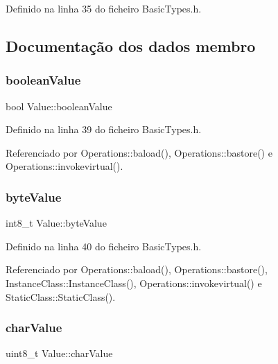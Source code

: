 Definido na linha 35 do ficheiro Basic\+Types.\+h.



\subsection{Documentação dos dados membro}
\mbox{\label{structValue_a30e34bb4435bed7be1c5287e8f4c4838}} 
\subsubsection{\texorpdfstring{boolean\+Value}{booleanValue}}
{\footnotesize\ttfamily bool Value\+::boolean\+Value}



Definido na linha 39 do ficheiro Basic\+Types.\+h.



Referenciado por Operations\+::baload(), Operations\+::bastore() e Operations\+::invokevirtual().

\mbox{\label{structValue_a5fe45e55ee027508eaa68b9133776591}} 
\subsubsection{\texorpdfstring{byte\+Value}{byteValue}}
{\footnotesize\ttfamily int8\+\_\+t Value\+::byte\+Value}



Definido na linha 40 do ficheiro Basic\+Types.\+h.



Referenciado por Operations\+::baload(), Operations\+::bastore(), Instance\+Class\+::\+Instance\+Class(), Operations\+::invokevirtual() e Static\+Class\+::\+Static\+Class().

\mbox{\label{structValue_a100a56df80b9c3f796f053b9eef2b69a}} 
\subsubsection{\texorpdfstring{char\+Value}{charValue}}
{\footnotesize\ttfamily uint8\+\_\+t Value\+::char\+Value}



